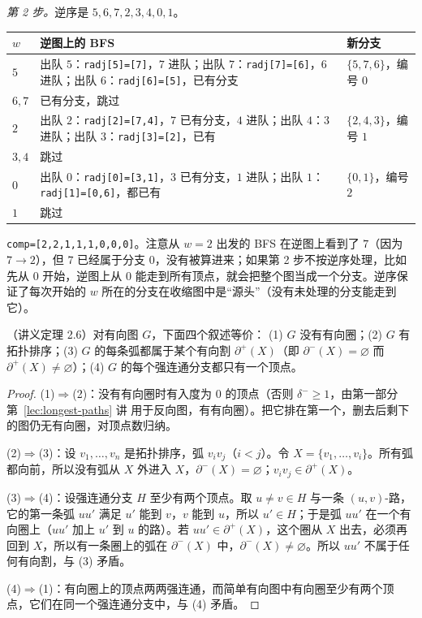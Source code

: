 \begin{example}
\emph{第 2 步。}逆序是 $5,6,7,2,3,4,0,1$。
\begin{center}
\small
\begin{tabular}{lp{8.4cm}p{2.6cm}}
\toprule
$w$ & 逆图上的 BFS & 新分支 \\
\midrule
$5$ & 出队 $5$：\texttt{radj[5]=[7]}，$7$ 进队；出队 $7$：\texttt{radj[7]=[6]}，$6$ 进队；出队 $6$：\texttt{radj[6]=[5]}，已有分支 & $\{5,7,6\}$，编号 $0$ \\
$6,7$ & 已有分支，跳过 & \\
$2$ & 出队 $2$：\texttt{radj[2]=[7,4]}，$7$ 已有分支，$4$ 进队；出队 $4$：$3$ 进队；出队 $3$：\texttt{radj[3]=[2]}，已有 & $\{2,4,3\}$，编号 $1$ \\
$3,4$ & 跳过 & \\
$0$ & 出队 $0$：\texttt{radj[0]=[3,1]}，$3$ 已有分支，$1$ 进队；出队 $1$：\texttt{radj[1]=[0,6]}，都已有 & $\{0,1\}$，编号 $2$ \\
$1$ & 跳过 & \\
\bottomrule
\end{tabular}
\end{center}
\texttt{comp=[2,2,1,1,1,0,0,0]}。注意从 $w=2$ 出发的 BFS 在逆图上看到了 $7$（因为 $7\to2$），但 $7$ 已经属于分支 $0$，没有被算进来；如果第 2 步不按逆序处理，比如先从 $0$ 开始，逆图上从 $0$ 能走到所有顶点，就会把整个图当成一个分支。逆序保证了每次开始的 $w$ 所在的分支在收缩图中是“源头”（没有未处理的分支能走到它）。
\end{example}


\begin{theorem}\label{thm:digraph-orders:dag}
（讲义定理 2.6）对有向图 $G$，下面四个叙述等价：
(1) $G$ 没有有向圈；(2) $G$ 有拓扑排序；(3) $G$ 的每条弧都属于某个有向割 $\partial^+(X)$（即 $\partial^-(X)=\varnothing$ 而 $\partial^+(X)\neq\varnothing$）；(4) $G$ 的每个强连通分支都只有一个顶点。
\end{theorem}
\begin{proof}
(1)$\Rightarrow$(2)：没有有向圈时有入度为 $0$ 的顶点（否则 $\delta^-\geqslant1$，由第一部分第~\ref{lec:longest-paths} 讲 用于反向图，有有向圈）。把它排在第一个，删去后剩下的图仍无有向圈，对顶点数归纳。

(2)$\Rightarrow$(3)：设 $v_1,\dots,v_n$ 是拓扑排序，弧 $v_iv_j$（$i<j$）。令 $X=\{v_1,\dots,v_i\}$。所有弧都向前，所以没有弧从 $X$ 外进入 $X$，$\partial^-(X)=\varnothing$；$v_iv_j\in\partial^+(X)$。

(3)$\Rightarrow$(4)：设强连通分支 $H$ 至少有两个顶点。取 $u\neq v\in H$ 与一条 $(u,v)$-路，它的第一条弧 $uu'$ 满足 $u'$ 能到 $v$，$v$ 能到 $u$，所以 $u'\in H$；于是弧 $uu'$ 在一个有向圈上（$uu'$ 加上 $u'$ 到 $u$ 的路）。若 $uu'\in\partial^+(X)$，这个圈从 $X$ 出去，必须再回到 $X$，所以有一条圈上的弧在 $\partial^-(X)$ 中，$\partial^-(X)\neq\varnothing$。所以 $uu'$ 不属于任何有向割，与 (3) 矛盾。

(4)$\Rightarrow$(1)：有向圈上的顶点两两强连通，而简单有向图中有向圈至少有两个顶点，它们在同一个强连通分支中，与 (4) 矛盾。
\end{proof}

